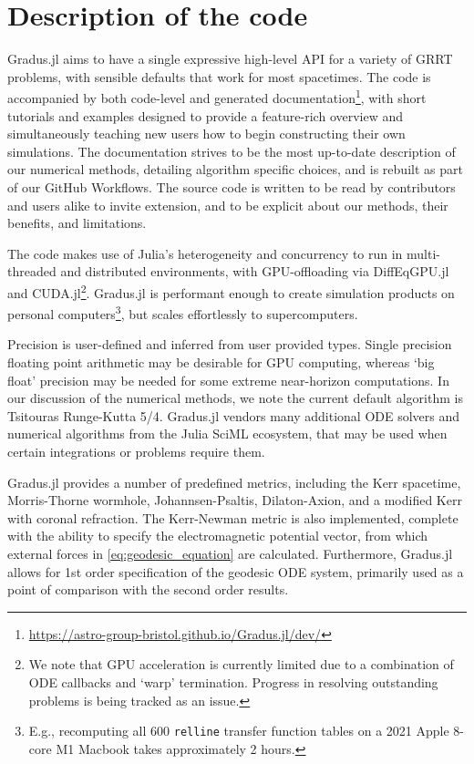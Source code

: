 \section{Description of the code}

Gradus.jl aims to have a single expressive high-level API for a variety of GRRT problems, with sensible defaults that work for most spacetimes. The code is accompanied by both code-level and generated documentation\footnote{\url{https://astro-group-bristol.github.io/Gradus.jl/dev/}}, with short tutorials and examples designed to provide a feature-rich overview and simultaneously teaching new users how to begin constructing their own simulations. The documentation strives to be the most up-to-date description of our numerical methods, detailing algorithm specific choices, and is rebuilt as part of our GitHub Workflows. The source code is written to be read by contributors and users alike to invite extension, and to be explicit about our methods, their benefits, and limitations.

The code makes use of Julia's heterogeneity and concurrency to run in multi-threaded and distributed environments, with GPU-offloading via DiffEqGPU.jl and CUDA.jl\footnote{We note that GPU acceleration is currently limited due to a combination of ODE callbacks and `warp' termination. Progress in resolving outstanding problems is being tracked as an issue.}. Gradus.jl is performant enough to create simulation products on personal computers\footnote{E.g., recomputing all 600 \texttt{relline} transfer function tables \cite{} on a 2021 Apple 8-core M1 Macbook takes approximately 2 hours.}, but scales effortlessly to supercomputers.

Precision is user-defined and inferred from user provided types. Single precision floating point arithmetic may be desirable for GPU computing, whereas `big float' precision may be needed for some extreme near-horizon computations. In our discussion of the numerical methods, we note the current default algorithm is Tsitouras Runge-Kutta 5/4. Gradus.jl vendors many additional ODE solvers and numerical algorithms from the Julia SciML ecosystem, that may be used when certain integrations or problems require them.

Gradus.jl provides a number of predefined metrics, including the Kerr spacetime, Morris-Thorne wormhole, Johannsen-Psaltis, Dilaton-Axion, and a modified Kerr with coronal refraction. The Kerr-Newman metric is also implemented, complete with the ability to specify the electromagnetic potential vector, from which external forces in \eqref{eq:geodesic_equation} are calculated. Furthermore, Gradus.jl allows for 1st order specification of the geodesic ODE system, primarily used as a point of comparison with the second order results.

